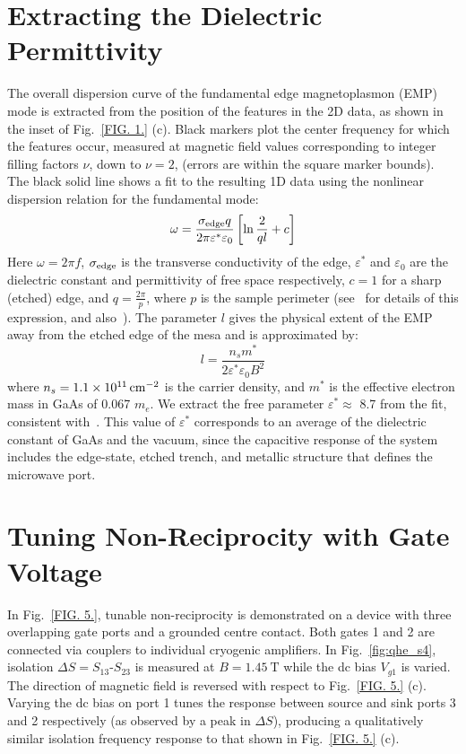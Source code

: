 \section{Extracting the Dielectric Permittivity}
\label{sec:qhe_di}
The overall dispersion curve of the fundamental edge magnetoplasmon (EMP) mode is extracted from the position of the features in the 2D data, as shown in the inset of Fig.~\ref{FIG. 1.} (c). Black markers plot the center frequency for which the features occur, measured at magnetic field values corresponding to integer filling factors $\nu$, down to $\nu = 2$, (errors are within the square marker bounds). The black solid line shows a fit to the resulting 1D data using the nonlinear dispersion relation for the fundamental mode:
\begin{equation}
 \omega  = \frac{{\sigma_{\rm{edge}} q}}{{2\pi {\varepsilon ^*}{\varepsilon _0}}}\left[ {\ln \frac{2}{{ql}} + c} \right]
\end{equation}
Here $\omega  = 2\pi f$, $\sigma_{\rm{edge}}$ is the transverse conductivity of the edge, ${{\varepsilon ^*}}$ and ${{\varepsilon _0}}$ are the dielectric constant and permittivity of free space respectively, $c = 1$ for a sharp (etched) edge, and $q = \tfrac{{2\pi }}{p}$, where $p$ is the sample perimeter (see~\cite{1988ZhETF..94..217V} for details of this expression, and also~\cite{petkovic2013carrier,kumada2014resonant,balaban1997observation}). The parameter $l$ gives the physical extent of the EMP away from the etched edge of the mesa and is approximated by:
\begin{equation}
 l = \frac{{{n_s}{m^*}}}{{2 {\varepsilon ^*}{\varepsilon _0}{B^2}}}
\end{equation}
where $n_s = \SI{1.1e11}{\per\square\centi\meter}$ is the carrier density, and ${{m^*}}$ is the effective electron mass in GaAs of 0.067 ${m_e}$. We extract the free parameter ${{\varepsilon ^*}} \approx$ 8.7 from the fit, consistent with~\cite{balaban1997observation}. This value of ${{\varepsilon ^*}}$ corresponds to an average of the dielectric constant of GaAs and the vacuum, since the capacitive response of the system includes the edge-state, etched trench, and metallic structure that defines the microwave port.

\clearpage
\section{Tuning Non-Reciprocity with Gate Voltage}
\label{sec:qhe_tune}
In Fig.~\ref{FIG. 5.}, tunable non-reciprocity is demonstrated on a device with three overlapping gate ports and a grounded centre contact. Both gates 1 and 2 are connected via couplers to individual cryogenic amplifiers. In Fig.~\ref{fig:qhe_s4}, isolation $\Delta S = S_{13}$-$S_{23}$ is measured at $B = \SI{1.45}{\tesla}$ while the dc bias $V_{g1}$ is varied. The direction of magnetic field is reversed with respect to Fig.~\ref{FIG. 5.} (c). Varying the dc bias on port 1 tunes the response between source and sink ports 3 and 2 respectively (as observed by a peak in $\Delta S$), producing a qualitatively similar isolation frequency response to that shown in Fig.~\ref{FIG. 5.} (c).

